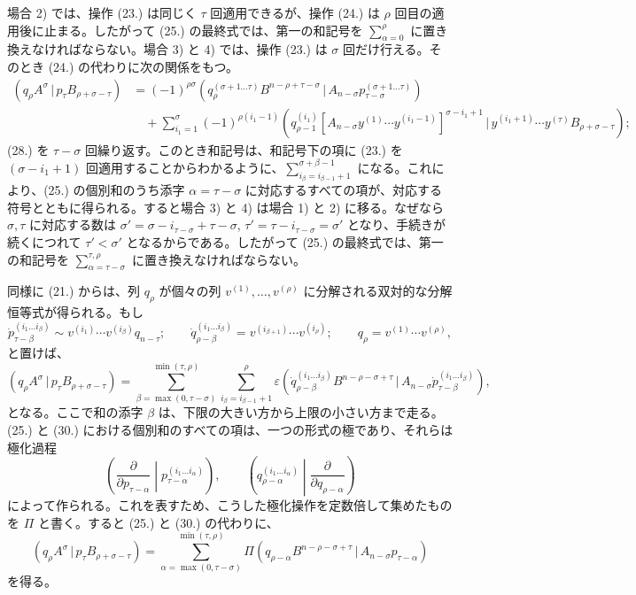 \documentclass[11pt]{article}
\newcommand{\pair}[2]{(#1\,|\,#2)}
\newcommand{\eps}{\varepsilon}
\begin{document}
場合 2) では、操作 (23.) は同じく $\tau$ 回適用できるが、操作 (24.) は $\rho$ 回目の適用後に止まる。したがって (25.) の最終式では、第一の和記号を $\sum_{\alpha=0}^{\rho}$ に置き換えなければならない。場合 3) と 4) では、操作 (23.) は $\sigma$ 回だけ行える。そのとき (24.) の代わりに次の関係をもつ。
\begin{equation}
\begin{aligned}
\pair{q_\rho A^\sigma}{p_\tau B_{\rho+\sigma-\tau}}
&=(-1)^{\rho\sigma}
 \pair{q_\rho^{(\sigma+1\ldots\tau)}B^{n-\rho+\tau-\sigma}}{A_{n-\sigma}p_{\tau-\sigma}^{(\sigma+1\ldots\tau)}}\\
&\quad+\sum_{i_1=1}^{\sigma}(-1)^{\rho(i_1-1)}
 \pair{q_{\rho-1}^{(i_1)}[A_{n-\sigma}y^{(1)}\cdots y^{(i_1-1)}]^{\sigma-i_1+1}}
 {y^{(i_1+1)}\cdots y^{(\tau)}B_{\rho+\sigma-\tau}};
\end{aligned}
\tag{28}
\end{equation}
(28.) を $\tau-\sigma$ 回繰り返す。このとき和記号は、和記号下の項に (23.) を $(\sigma-i_1+1)$ 回適用することからわかるように、$\sum_{i_\beta=i_{\beta-1}+1}^{\sigma+\beta-1}$ になる。これにより、(25.) の個別和のうち添字 $\alpha=\tau-\sigma$ に対応するすべての項が、対応する符号とともに得られる。すると場合 3) と 4) は場合 1) と 2) に移る。なぜなら $\sigma,\tau$ に対応する数は $\sigma'=\sigma-i_{\tau-\sigma}+\tau-\sigma$, $\tau'=\tau-i_{\tau-\sigma}=\sigma'$ となり、手続きが続くにつれて $\tau'<\sigma'$ となるからである。したがって (25.) の最終式では、第一の和記号を $\sum_{\alpha=\tau-\sigma}^{\tau,\rho}$ に置き換えなければならない。

同様に (21.) からは、列 $q_\rho$ が個々の列 $v^{(1)},\ldots,v^{(\rho)}$ に分解される双対的な分解恒等式が得られる。もし
\begin{equation}
 \dot p_{\tau-\beta}^{(i_1\ldots i_\beta)}\sim v^{(i_1)}\cdots v^{(i_\beta)}q_{n-\tau};\qquad
 \dot q_{\rho-\beta}^{(i_1\ldots i_\beta)}=v^{(i_{\beta+1})}\cdots v^{(i_\rho)};\qquad
 q_\rho=v^{(1)}\cdots v^{(\rho)},
\tag{29}
\end{equation}
と置けば、
\begin{equation}
 \pair{q_\rho A^\sigma}{p_\tau B_{\rho+\sigma-\tau}}
 =\sum_{\beta=\max(0,\tau-\sigma)}^{\min(\tau,\rho)}
   \sum_{i_\beta=i_{\beta-1}+1}^{\rho}\eps
\pair{\dot q_{\rho-\beta}^{(i_1\ldots i_\beta)}B^{n-\rho-\sigma+\tau}}{A_{n-\sigma}\dot p_{\tau-\beta}^{(i_1\ldots i_\beta)}} ,
\tag{30}
\end{equation}
となる。ここで和の添字 $\beta$ は、下限の大きい方から上限の小さい方まで走る。(25.) と (30.) における個別和のすべての項は、一つの形式の極であり、それらは極化過程
\[
\left(\frac{\partial}{\partial p_{\tau-\alpha}}\middle|p_{\tau-\alpha}^{(i_1\ldots i_\alpha)}\right),\qquad
\left(q_{\rho-\alpha}^{(i_1\ldots i_\alpha)}\middle|\frac{\partial}{\partial q_{\rho-\alpha}}\right)
\]
によって作られる。これを表すため、こうした極化操作を定数倍して集めたものを $\Pi$ と書く。すると (25.) と (30.) の代わりに、
\begin{equation}
 \pair{q_\rho A^\sigma}{p_\tau B_{\rho+\sigma-\tau}}
 =\sum_{\alpha=\max(0,\tau-\sigma)}^{\min(\tau,\rho)}
 \Pi\pair{q_{\rho-\alpha}B^{n-\rho-\sigma+\tau}}{A_{n-\sigma}p_{\tau-\alpha}}
\tag{31}
\end{equation}
を得る。
\end{document}
